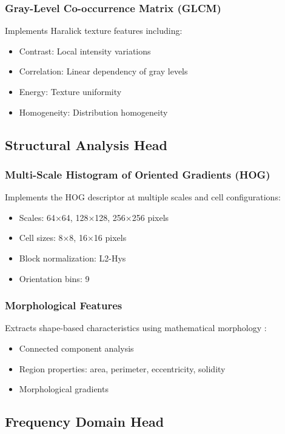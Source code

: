 \documentclass[12pt,a4paper]{article}
\begin{document}
\subsubsection{Gray-Level Co-occurrence Matrix (GLCM)}
Implements Haralick texture features \cite{haralick1973texture} including:
\begin{itemize}
    \item Contrast: Local intensity variations
    \item Correlation: Linear dependency of gray levels
    \item Energy: Texture uniformity
    \item Homogeneity: Distribution homogeneity
\end{itemize}

\subsection{Structural Analysis Head}

\subsubsection{Multi-Scale Histogram of Oriented Gradients (HOG)}
Implements the HOG descriptor \cite{dalal2005histograms} at multiple scales and cell configurations:
\begin{itemize}
    \item Scales: 64×64, 128×128, 256×256 pixels
    \item Cell sizes: 8×8, 16×16 pixels
    \item Block normalization: L2-Hys
    \item Orientation bins: 9
\end{itemize}

\subsubsection{Morphological Features}
Extracts shape-based characteristics using mathematical morphology \cite{soille2003morphological}:
\begin{itemize}
    \item Connected component analysis
    \item Region properties: area, perimeter, eccentricity, solidity
    \item Morphological gradients
\end{itemize}

\subsection{Frequency Domain Head}
\end{document}
